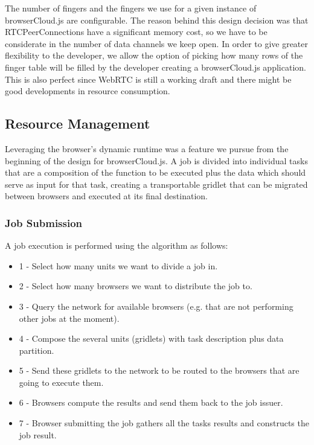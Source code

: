 The number of fingers and the fingers we use for a given instance of browserCloud.js are configurable. The reason behind this design decision was that RTCPeerConnections have a significant memory cost, so we have to be considerate in the number of data channels we keep open. In order to give greater flexibility to the developer, we allow the option of picking how many rows of the finger table will be filled by the developer creating a browserCloud.js application. This is also perfect since WebRTC is still a working draft and there might be good developments in resource consumption.

\subsection{Resource Management}

Leveraging the browser's dynamic runtime was a feature we pursue from the beginning of the design for browserCloud.js. A job is divided into individual tasks that are a composition of the function to be executed plus the data which should serve as input for that task, creating a transportable gridlet that can be migrated between browsers and executed at its final destination.

\subsubsection{Job Submission}

A job execution is performed using the algorithm as follows:

\begin{itemize}
    \item 1 - Select how many units we want to divide a job in.
    \item 2 - Select how many browsers we want to distribute the job to.
    \item 3 - Query the network for available browsers (e.g. that are not performing other jobs at the moment).
    \item 4 - Compose the several units (gridlets) with task description plus data partition.
    \item 5 - Send these gridlets to the network to be routed to the browsers that are going to execute them.
    \item 6 - Browsers compute the results and send them back to the job issuer.
    \item 7 - Browser submitting the job gathers all the tasks results and constructs the job result.
\end{itemize}

